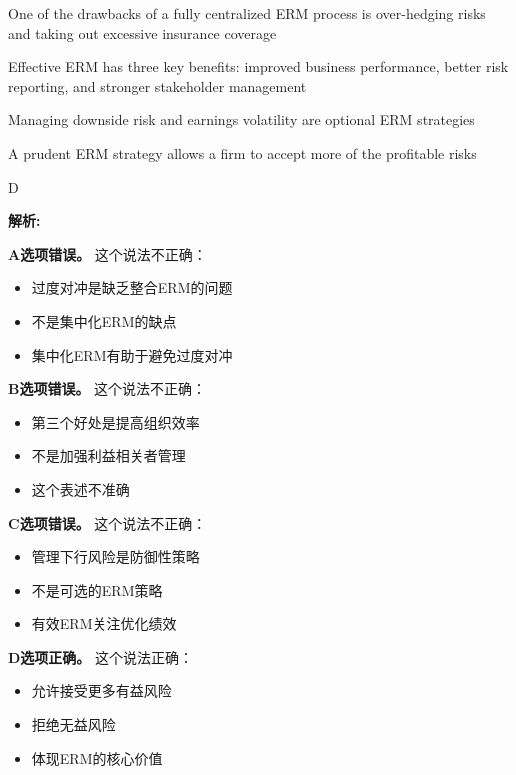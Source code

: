 \documentclass{article}
\newenvironment{explanation}
{\textbf{解析:}\par}
{\par}
\begin{document}
\begin{choices}
    \item One of the drawbacks of a fully centralized ERM process is over-hedging risks and taking out excessive insurance coverage
    \item Effective ERM has three key benefits: improved business performance, better risk reporting, and stronger stakeholder management
    \item Managing downside risk and earnings volatility are optional ERM strategies
    \item A prudent ERM strategy allows a firm to accept more of the profitable risks
\end{choices}

\begin{correctanswer}
    D
\end{correctanswer}

\begin{explanation}
    \textbf{A选项错误。}
    这个说法不正确：
    \begin{itemize}
        \item 过度对冲是缺乏整合ERM的问题
        \item 不是集中化ERM的缺点
        \item 集中化ERM有助于避免过度对冲
    \end{itemize}

    \textbf{B选项错误。}
    这个说法不正确：
    \begin{itemize}
        \item 第三个好处是提高组织效率
        \item 不是加强利益相关者管理
        \item 这个表述不准确
    \end{itemize}

    \textbf{C选项错误。}
    这个说法不正确：
    \begin{itemize}
        \item 管理下行风险是防御性策略
        \item 不是可选的ERM策略
        \item 有效ERM关注优化绩效
    \end{itemize}

    \textbf{D选项正确。}
    这个说法正确：
    \begin{itemize}
        \item 允许接受更多有益风险
        \item 拒绝无益风险
        \item 体现ERM的核心价值
    \end{itemize}
\end{explanation}
\end{document}
